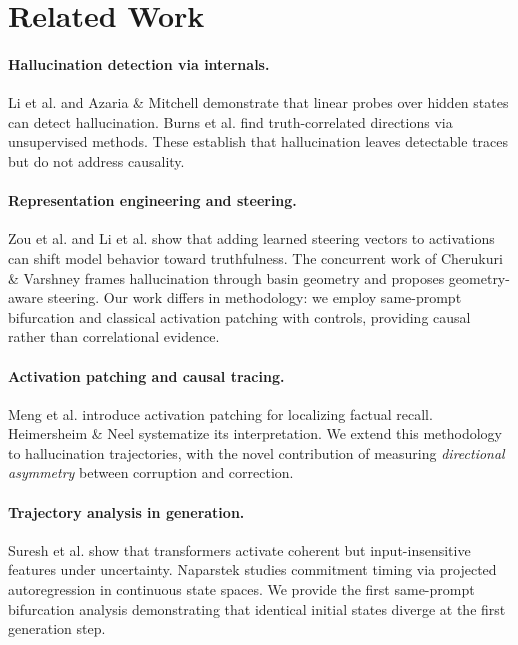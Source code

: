 \documentclass[11pt,a4paper]{article}
\begin{document}
\section{Related Work}

\paragraph{Hallucination detection via internals.} Li et al. \cite{li2023inference} and Azaria \& Mitchell \cite{azaria2023internal} demonstrate that linear probes over hidden states can detect hallucination. Burns et al. \cite{burns2022discovering} find truth-correlated directions via unsupervised methods. These establish that hallucination leaves detectable traces but do not address causality.

\paragraph{Representation engineering and steering.} Zou et al. \cite{zou2023representation} and Li et al. \cite{li2023inference} show that adding learned steering vectors to activations can shift model behavior toward truthfulness. The concurrent work of Cherukuri \& Varshney \cite{cherukuri2026basins} frames hallucination through basin geometry and proposes geometry-aware steering. Our work differs in methodology: we employ same-prompt bifurcation and classical activation patching with controls, providing causal rather than correlational evidence.

\paragraph{Activation patching and causal tracing.} Meng et al. \cite{meng2022locating} introduce activation patching for localizing factual recall. Heimersheim \& Neel \cite{heimersheim2024use} systematize its interpretation. We extend this methodology to hallucination trajectories, with the novel contribution of measuring \emph{directional asymmetry} between corruption and correction.

\paragraph{Trajectory analysis in generation.} Suresh et al. \cite{suresh2025noise} show that transformers activate coherent but input-insensitive features under uncertainty. Naparstek \cite{token2026maturation} studies commitment timing via projected autoregression in continuous state spaces. We provide the first same-prompt bifurcation analysis demonstrating that identical initial states diverge at the first generation step.
\end{document}
